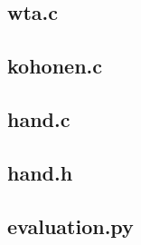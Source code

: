 \documentclass{article}
\begin{document}
\subsection*{wta.c}

\newpage
\subsection*{kohonen.c}

\newpage
\subsection*{hand.c}

\newpage
\subsection*{hand.h}

\newpage
\subsection*{evaluation.py}

\newpage
\end{document}
